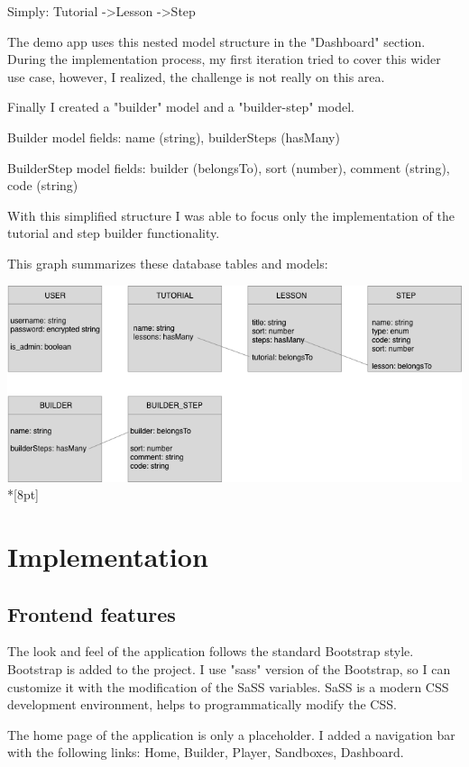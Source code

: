 \documentclass[12pt, a4paper, oneside, openright, medskipamount]{report}
\begin{document}
Simply: Tutorial -\textgreater Lesson -\textgreater Step

The demo app uses this nested model structure in the "Dashboard" section. During the implementation process, my first iteration tried to cover this wider use case, however, I realized, the challenge is not really on this area.

Finally I created a "builder" model and a "builder-step" model.

Builder model fields: name (string), builderSteps (hasMany)

BuilderStep model fields: builder (belongsTo), sort (number), comment (string), code (string)

With this simplified structure I was able to focus only the implementation of the tutorial and step builder functionality.

This graph summarizes these database tables and models:

\includegraphics[width=1\textwidth]{assets/database-tables}\\*[8pt]


\chapter{Implementation}

\section{Frontend features}

The look and feel of the application follows the standard Bootstrap style. Bootstrap is added to the project. I use "sass" version of the Bootstrap, so I can customize it with the modification of the SaSS variables. SaSS is a modern CSS development environment, helps to programmatically modify the CSS.

The home page of the application is only a placeholder. I added a navigation bar with the following links: Home, Builder, Player, Sandboxes, Dashboard.
\end{document}
